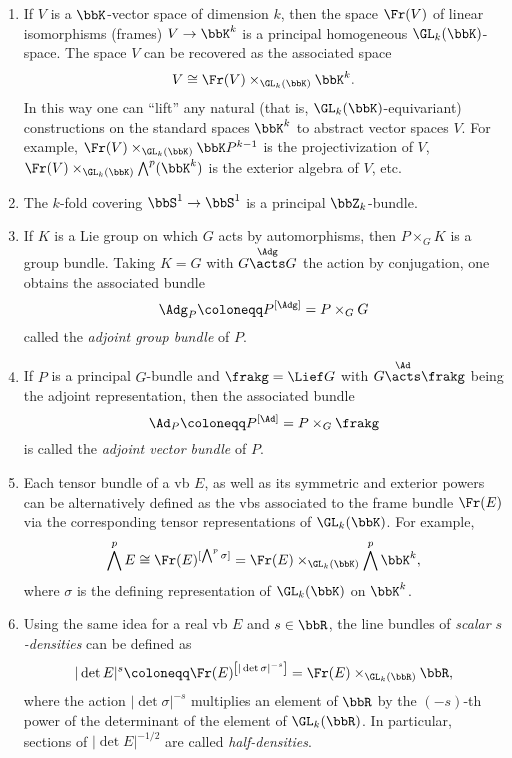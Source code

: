 \begin{example}
    \begin{enumerate}
        \item If $V$ is a $\bbK$-vector space of dimension $k$, then the space $\Fr(V)$ of linear isomorphisms (frames) $V\to \bbK^k$ is a principal homogeneous $\GL_k(\bbK)$-space. The space $V$ can be recovered as the associated space
        \[V\cong \Fr(V)\times_{\GL_k(\bbK)} \bbK^k.\]
        In this way one can ``lift'' any natural (that is, $\GL_k(\bbK)$-equivariant) constructions on the standard spaces $\bbK^k$ to abstract vector spaces $V$. For example, $\Fr(V)\times_{\GL_k(\bbK)} \bbK P^{k-1}$ is the projectivization of $V$, $\Fr(V)\times_{\GL_k(\bbK)}\bigwedge^p(\bbK^k)$ is the exterior algebra of $V$, etc.
        
        \item The $k$-fold covering $\bbS^1\to \bbS^1$ is a principal $\bbZ_k$-bundle.
        
        \item If $K$ is a Lie group on which $G$ acts by automorphisms, then $P\times_G K$ is a group bundle. Taking $K=G$ with $G\overset{\Adg}{\acts}G$ the action by conjugation, one obtains the associated bundle \[\Adg_P\coloneqq P^{[\Adg]}=P\times_G G\]
        called the \emph{adjoint group bundle} of $P$.

        \item If $P$ is a principal $G$-bundle and $\frakg=\Lief G$ with $G\overset{\Ad}{\acts}\frakg$ being the adjoint representation, then the associated bundle \[\Ad_P\coloneqq P^{[\Ad]}=P\times_G \frakg\] is called the \emph{adjoint vector bundle} of $P$.
       
        \item Each tensor bundle of a \gls{vb} $E$, as well as its symmetric and exterior powers can be alternatively defined as the \glspl{vb} associated to the frame bundle $\Fr(E)$ via the corresponding tensor representations of $\GL_k(\bbK)$. For example, \[\bigwedge^p E\cong \Fr(E)^{[\bigwedge^p \sigma]}=\Fr(E)\times_{\GL_k(\bbK)} \bigwedge^p \bbK^k,\]
        where $\sigma$ is the defining representation of $\GL_k(\bbK)$ on $\bbK^k$. 
        
        \item Using the same idea for a real \gls{vb} $E$ and $s\in\bbR$, the line bundles of \emph{scalar $s$-densities} can be defined as
        \[|\det E|^s\coloneqq \Fr(E)^{\left[|\det \sigma|^{-s}\right]}=\Fr(E)\times_{\GL_k(\bbR)}\bbR,\]
        where the action $|\det \sigma|^{-s}$ multiplies an element of $\bbR$ by the $(-s)$-th power of the determinant of the element of $\GL_k(\bbR)$. In particular, sections of $|\det E|^{-1/2}$ are called \emph{half-densities}.
        

\end{enumerate}
\end{example}
